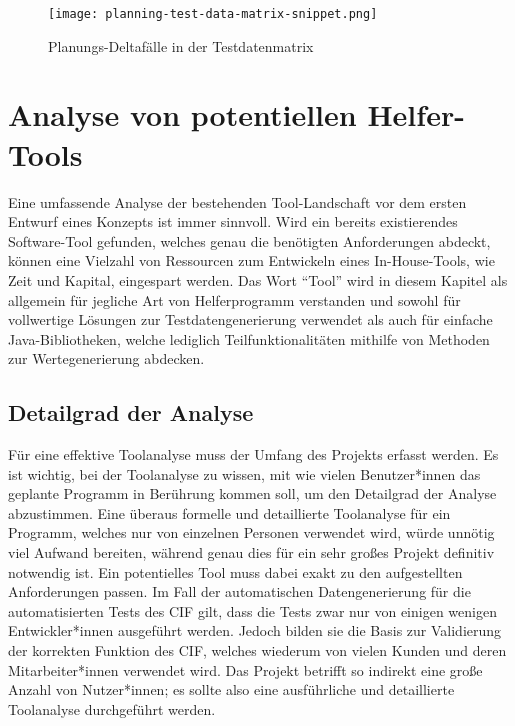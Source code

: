 \begin{figure}[h]
    \centering
    \texttt{[image: planning-test-data-matrix-snippet.png]}
    \caption{Planungs-Deltafälle in der Testdatenmatrix}
\end{figure}

\section{Analyse von potentiellen Helfer-Tools}\label{sec:toolanalyse}
Eine umfassende Analyse der bestehenden Tool-Landschaft vor dem ersten Entwurf eines Konzepts ist immer sinnvoll. Wird ein bereits existierendes Software-Tool gefunden, welches genau die benötigten Anforderungen abdeckt, können eine Vielzahl von Ressourcen zum Entwickeln eines In-House-Tools, wie Zeit und Kapital, eingespart werden. Das Wort \enquote{Tool} wird in diesem Kapitel als allgemein für jegliche Art von Helferprogramm verstanden und sowohl für vollwertige Lösungen zur Testdatengenerierung verwendet als auch für einfache Java-Bibliotheken, welche lediglich Teilfunktionalitäten mithilfe von Methoden zur Wertegenerierung abdecken. 

\subsection{Detailgrad der Analyse}\label{toolanalysedetail}
Für eine effektive Toolanalyse muss der Umfang des Projekts erfasst werden. Es ist wichtig, bei der Toolanalyse zu wissen, mit wie vielen Benutzer*innen das geplante Programm in Berührung kommen soll, um den Detailgrad der Analyse abzustimmen. Eine überaus formelle und detaillierte Toolanalyse für ein Programm, welches nur von einzelnen Personen verwendet wird, würde unnötig viel Aufwand bereiten, während genau dies für ein sehr großes Projekt definitiv notwendig ist. Ein potentielles Tool muss dabei exakt zu den aufgestellten Anforderungen passen. \cite[S. 249]{fewster:1999} Im Fall der automatischen Datengenerierung für die automatisierten Tests des \ac{CIF} gilt, dass die Tests zwar nur von einigen wenigen Entwickler*innen ausgeführt werden. Jedoch bilden sie die Basis zur Validierung der korrekten Funktion des \ac{CIF}, welches wiederum von vielen Kunden und deren Mitarbeiter*innen verwendet wird. Das Projekt betrifft so indirekt eine große Anzahl von Nutzer*innen; es sollte also eine ausführliche und detaillierte Toolanalyse durchgeführt werden.

